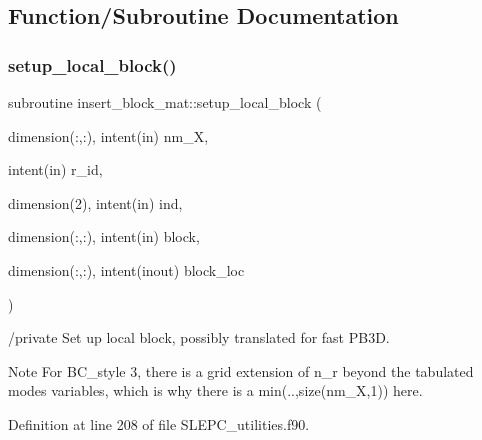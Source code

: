 \subsection{Function/\+Subroutine Documentation}
\mbox{\label{SLEPC__utilities_8f90_a711d6be49d3b1542ee3375bceb5b4e6d}} 
\subsubsection{\texorpdfstring{setup\+\_\+local\+\_\+block()}{setup\_local\_block()}}
{\footnotesize\ttfamily subroutine insert\+\_\+block\+\_\+mat\+::setup\+\_\+local\+\_\+block (\begin{DoxyParamCaption}\item[{dimension(\+:,\+:), intent(in)}]{nm\+\_\+X,  }\item[{intent(in)}]{r\+\_\+id,  }\item[{dimension(2), intent(in)}]{ind,  }\item[{dimension(\+:,\+:), intent(in)}]{block,  }\item[{dimension(\+:,\+:), intent(inout)}]{block\+\_\+loc }\end{DoxyParamCaption})}



/private Set up local block, possibly translated for fast P\+B3D. 

\begin{DoxyNote}{Note}
For B\+C\+\_\+style 3, there is a grid extension of n\+\_\+r beyond the tabulated modes variables, which is why there is a \textquotesingle{}min(..,size(nm\+\_\+\+X,1))\textquotesingle{} here. 
\end{DoxyNote}


Definition at line 208 of file S\+L\+E\+P\+C\+\_\+utilities.\+f90.

